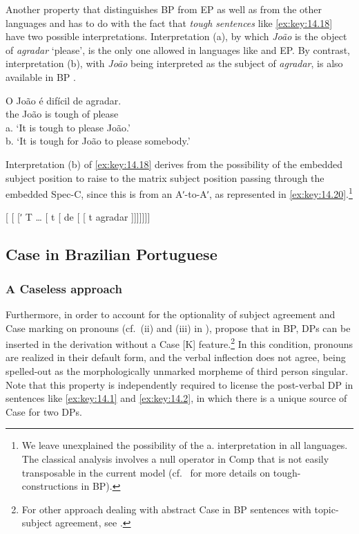 \documentclass[output=paper]{langsci/langscibook}
\begin{document}
Another property that distinguishes \gls{BP} from \gls{EP} as well as from
the other  languages and  has to do with the fact that
\emph{tough} \emph{sentences} like \eqref{ex:key:14.18} have two possible
interpretations. Interpretation (a), by which \emph{João} is the object of
\emph{agradar} ‘please’, is the only one allowed in languages like  and
EP. By contrast, interpretation (b), with \emph{João} being interpreted as the
subject of \emph{agradar}, is also available in \gls{BP} \citep{Galves1987}.

\ea%
    \label{ex:key:14.18}
    \sn
    \gll    O João é difícil de agradar.\\
            the João is tough of please\\
    \glt    a. ‘It is tough to please João.’\\
            b. ‘It is tough for João to please somebody.’
\z

Interpretation (b) of  \eqref{ex:key:14.18} derives from the possibility of the
embedded subject position to raise to the matrix subject position passing
through the embedded Spec-C, since this  is from an Aʹ-to-Aʹ, as
represented in \eqref{ex:key:14.20}.\footnote{We leave unexplained the possibility
of the a. interpretation in all languages. The classical analysis involves a
null operator in Comp that is not easily transposable in the current model
(cf.\ \citealt{Moreno2014} for more details on tough-constructions in BP).}

\ea\label{ex:key:14.19}
    {}[ [ [ʹ T \dots{} [ t [ de
    [ [ t agradar ]]]]]]]
\z

\subsection{Case in Brazilian Portuguese}\label{sec:key:14.4.2}

\subsubsection{A Caseless approach}\label{sec:key:15.4.2.1}

Furthermore, in order to account for the optionality of subject agreement and
Case marking on pronouns (cf.\ (ii) and (iii) in ),
\textcite{AvelarGalves2011,AvelarGalves2016} propose that in BP, DPs can be inserted in the
derivation without a Case [K] feature.\footnote{For other approach dealing with
abstract Case in \gls{BP} sentences with topic-subject agreement, see
\citet{Nunes2017}.} In this condition, pronouns are realized in their default
form, and the verbal inflection does not agree, being spelled-out as the
morphologically unmarked morpheme of third person singular. Note that this
property is independently required to license the post-verbal DP in sentences
like \eqref{ex:key:14.1} and \eqref{ex:key:14.2}, in which there is a unique
source of Case for two DPs.
\end{document}
